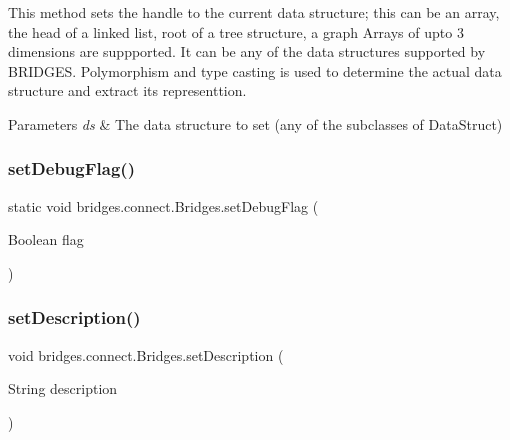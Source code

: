 This method sets the handle to the current data structure; this can be an array, the head of a linked list, root of a tree structure, a graph Arrays of upto 3 dimensions are suppported. It can be any of the data structures supported by B\+R\+I\+D\+G\+ES. Polymorphism and type casting is used to determine the actual data structure and extract its representtion.


\begin{DoxyParams}{Parameters}
{\em ds} & The data structure to set (any of the subclasses of Data\+Struct) \\
\hline
\end{DoxyParams}
\mbox{\label{classbridges_1_1connect_1_1_bridges_a9295b15aa880aa976706ed4f3337fb3b}} 
\subsubsection{\texorpdfstring{set\+Debug\+Flag()}{setDebugFlag()}}
{\footnotesize\ttfamily static void bridges.\+connect.\+Bridges.\+set\+Debug\+Flag (\begin{DoxyParamCaption}\item[{Boolean}]{flag }\end{DoxyParamCaption})\hspace{0.3cm}{\ttfamily [static]}}

\mbox{\label{classbridges_1_1connect_1_1_bridges_a50d1d5aa64d312393b63d1be854e34a2}} 
\subsubsection{\texorpdfstring{set\+Description()}{setDescription()}}
{\footnotesize\ttfamily void bridges.\+connect.\+Bridges.\+set\+Description (\begin{DoxyParamCaption}\item[{String}]{description }\end{DoxyParamCaption})}



